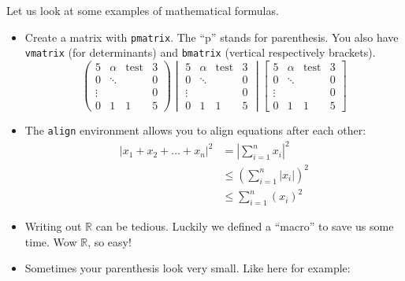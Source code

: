 \documentclass{article}
\theoremstyle{plain}
\theoremstyle{definition}
\theoremstyle{remark}
\newcommand{\R}{\mathbb{R}}
\begin{document}
Let us look at some examples of mathematical formulas.
\begin{itemize}
	\item Create a matrix with \texttt{pmatrix}. The ``p'' stands for parenthesis. You also have
	      \texttt{vmatrix} (for determinants) and \texttt{bmatrix} (vertical respectively
	      brackets).
	      \begin{equation*}
		      \begin{pmatrix}
			      5      & \alpha & \text{test} & 3 \\
			      0      & \ddots &             & 0 \\
			      \vdots &        &             & 0 \\
			      0      & 1      & 1           & 5
		      \end{pmatrix}
		      \begin{vmatrix}
			      5      & \alpha & \text{test} & 3 \\
			      0      & \ddots &             & 0 \\
			      \vdots &        &             & 0 \\
			      0      & 1      & 1           & 5
		      \end{vmatrix}
		      \begin{bmatrix}
			      5      & \alpha & \text{test} & 3 \\
			      0      & \ddots &             & 0 \\
			      \vdots &        &             & 0 \\
			      0      & 1      & 1           & 5
		      \end{bmatrix}
	      \end{equation*}
	\item The \texttt{align} environment allows you to align equations after each other:
	      \begin{align*}
		      |x_1+x_2+\dots +x_n|^2 & = |\sum_{i=1}^{n}x_i|^2      \\
		                             & \leq (\sum_{i=1}^{n}|x_i|)^2 \\
		                             & \leq \sum_{i=1}^n(x_i)^2
	      \end{align*}
	\item Writing out $\mathbb{R}$ can be tedious. Luckily we defined a ``macro'' to save us some
	      time. Wow $\R$, so easy!
	\item Sometimes your parenthesis look very small. Like here for example:
	      \begin{equation*}

\end{equation*}
\end{itemize}
\end{document}
